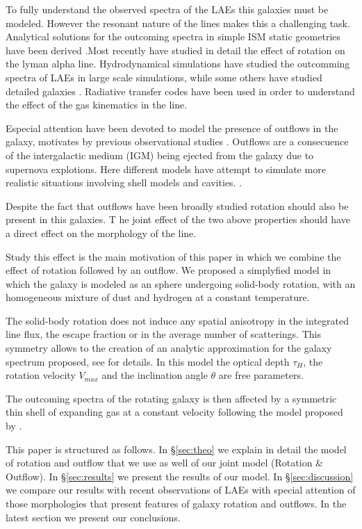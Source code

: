 \documentclass{latex/emulateapj}
\begin{document}
To fully understand the observed spectra of the LAEs this galaxies must be
modeled. However the resonant nature of the lines makes this a challenging
task. Analytical solutions for the outcoming spectra in simple ISM static
geometries have been derived \cite{Adams72, Harrington73, Neufeld90,
  Dijkstra06}.Most recently \cite{Garavito14} have studied in
detail the effect of rotation on the lyman alpha line.
Hydrodynamical simulations have studied the
outcomming spectra of LAEs in large scale simulations, while some
others have studied detailed galaxies \citep{Verhamme12}.  
Radiative transfer codes \citep{Laursen09, Verhamme06, CLARA}have been
used in order to understand the effect of the gas kinematics in the
\lya line.

Especial attention have been devoted to model the presence of
outflows in the galaxy, motivates by previous observational 
studies . Outflows are a consecuence of the
intergalactic medium (IGM) being ejected from the galaxy due to
supernova explotions. Here different models have attempt to 
simulate more realistic situations involving shell models and cavities. 
\citep{Behrens2014}. 

Despite the fact that outflows have been broadly studied 
rotation should also be present in this galaxies. T
he joint effect of the two above properties should have 
a direct effect on the morphology of the \lya line. 

Study this effect is the main motivation of this paper in which we combine the
effect of rotation followed by an outflow. We proposed a simplyfied
model in which the galaxy is modeled as an sphere undergoing
solid-body rotation, with an homogeneous mixture of dust and 
hydrogen at a constant temperature.    

The solid-body rotation does not induce any spatial anisotropy in the
integrated line flux,  the escape fraction or in the average number of
scatterings. This symmetry allows  to the creation of an analytic
approximation for the galaxy spectrum  proposed, see \cite{Garavito14}
for details. In this model the optical depth $\tau_{H}$, the  rotation
velocity $V_{max}$ and the inclination angle $\theta$ are free
parameters. 
 
The outcoming spectra of the rotating galaxy is then affected by a
symmetric thin shell of expanding gas at a constant velocity following
the model proposed by \cite{2014arXiv1404.2958V, Orsi12}.    

This paper is structured as follows. In \S \ref{sec:theo} we explain
in detail the model of rotation and outflow that we use as well of our
joint model (Rotation \& Outflow). In \S \ref{sec:results} we present
the results of our model. In \S \ref{sec:discussion} we compare our
results with  recent observations of LAEs with special attention of
those morphologies that present features of galaxy rotation and
outflows. In the latest section we present our  conclusions.  
\end{document}
